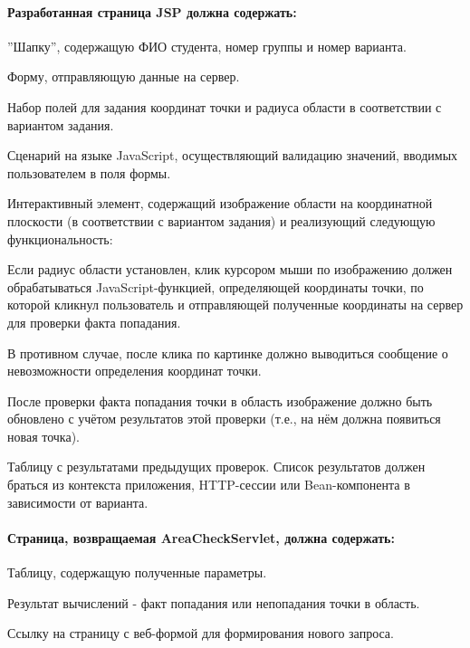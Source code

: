 \documentclass[a4paper, 12pt]{article}
\newenvironment{enumerate*}%
  {\begin{enumerate}%
    \setlength{\itemsep}{1pt}%
    \setlength{\parskip}{1pt}}%
  {\end{enumerate}}
\newenvironment{itemize*}%
  {\begin{itemize}%
    \setlength{\itemsep}{1pt}%
    \setlength{\parskip}{1pt}}%
  {\end{itemize}}
\begin{document}
\paragraph{Разработанная страница JSP должна содержать:}
\begin{enumerate*}
\item ''Шапку'', содержащую ФИО студента, номер группы и номер варианта.
\item Форму, отправляющую данные на сервер.
\item Набор полей для задания координат точки и радиуса области в соответствии с вариантом задания.
\item Сценарий на языке JavaScript, осуществляющий валидацию значений, вводимых пользователем в поля формы.
\item Интерактивный элемент, содержащий изображение области на координатной плоскости (в соответствии с вариантом задания) и реализующий следующую функциональность:
\begin{itemize*}
\item Если радиус области установлен, клик курсором мыши по изображению должен обрабатываться JavaScript-функцией, определяющей координаты точки, по которой кликнул пользователь и отправляющей полученные координаты на сервер для проверки факта попадания.
\item В противном случае, после клика по картинке должно выводиться сообщение о невозможности определения координат точки.
\item После проверки факта попадания точки в область изображение должно быть обновлено с учётом результатов этой проверки (т.е., на нём должна появиться новая точка).
\end{itemize*}
\item Таблицу с результатами предыдущих проверок. Список результатов должен браться из контекста приложения, HTTP-сессии или Bean-компонента в зависимости от варианта.
\end{enumerate*}

\paragraph{Страница, возвращаемая AreaCheckServlet, должна содержать:}

\begin{enumerate*}
	\item Таблицу, содержащую полученные параметры.
	\item Результат вычислений - факт попадания или непопадания точки в область.
	\item Ссылку на страницу с веб-формой для формирования нового запроса.
\end{enumerate*}
\end{document}
